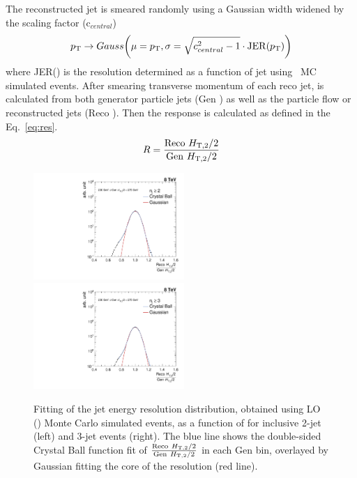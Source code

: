 The reconstructed jet \pt is smeared randomly using a Gaussian width widened by the scaling factor (c$_{central}$) 
\begin{equation}
p_{\mathrm{T}} \rightarrow Gauss\bigg(\mu = p_{\mathrm{T}}, \sigma = \sqrt{c^2_{central} - 1} \cdot {\rm JER}(p_{\mathrm{T}})\bigg)
\end{equation}
where JER(\pt) is the resolution determined as a function of jet \pt using \MGP~MC simulated events. After smearing transverse momentum of each reco jet, \httwo is calculated from both generator particle jets (Gen \httwons) as well as the particle flow or reconstructed jets (Reco \httwons). Then the response is calculated as defined in the Eq.~\ref{eq:res}. 
\begin{equation}
\label{eq:res}
  R = \frac{{\rm Reco}~\httwo}{{\rm Gen}~\httwo}
\end{equation}

\begin{figure}[ht]
 \begin{center}
 \hspace*{-5mm}\includegraphics[width=0.51\textwidth]{Plots_HT_2_150/Fit_Res_2_final_crystal_genbin_250-275_crystal_nomet.pdf}%
 ~~\includegraphics[width=0.51\textwidth]{Plots_HT_2_150/Fit_Res_3_final_crystal_genbin_250-275_crystal_nomet.pdf}
 \caption[Fitting of the jet energy resolution distribution as a function of \httwo.]{Fitting of the jet energy resolution distribution, obtained using LO \MadGraphFn\plusn \PYTHIAS (\MGP) Monte Carlo simulated events, as a function of \httwo for inclusive 2-jet (left) and 3-jet events (right). The blue line shows the double-sided Crystal Ball function fit of $\frac{{\rm Reco}~\httwo}{{\rm Gen}~\httwo}$ in each Gen \httwo bin, overlayed by Gaussian fitting the core of the resolution (red line).}
 \label{fig:fit_gauss}
 \end{center}
\end{figure}

